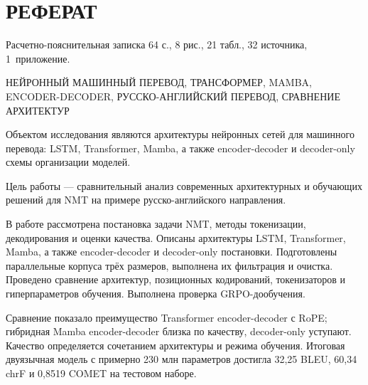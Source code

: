 \section*{\hfill РЕФЕРАТ \hfill}

Расчетно-пояснительная записка 64 с., 8 рис., 21 табл., 32 источника, 1~приложение.

НЕЙРОННЫЙ МАШИННЫЙ ПЕРЕВОД, ТРАНСФОРМЕР, MAMBA, ENCODER-DECODER, РУССКО-АНГЛИЙСКИЙ ПЕРЕВОД, СРАВНЕНИЕ АРХИТЕКТУР

Объектом исследования являются архитектуры нейронных сетей для машинного перевода: LSTM, Transformer, Mamba, а также encoder-decoder и decoder-only схемы организации моделей.

Цель работы --- сравнительный анализ современных архитектурных и обучающих решений для NMT на примере русско-английского направления.

В работе рассмотрена постановка задачи NMT, методы токенизации, декодирования и оценки качества. Описаны архитектуры LSTM, Transformer, Mamba, а также encoder-decoder и decoder-only постановки. Подготовлены параллельные корпуса трёх размеров, выполнена их фильтрация и очистка. Проведено сравнение архитектур, позиционных кодирований, токенизаторов и гиперпараметров обучения. Выполнена проверка GRPO-дообучения.

Сравнение показало преимущество Transformer encoder-decoder с RoPE; гибридная Mamba encoder-decoder близка по качеству, decoder-only уступают. Качество определяется сочетанием архитектуры и режима обучения. Итоговая двуязычная модель с примерно 230 млн параметров достигла 32{,}25 BLEU, 60{,}34 chrF и 0{,}8519 COMET на тестовом наборе.

\newpage
